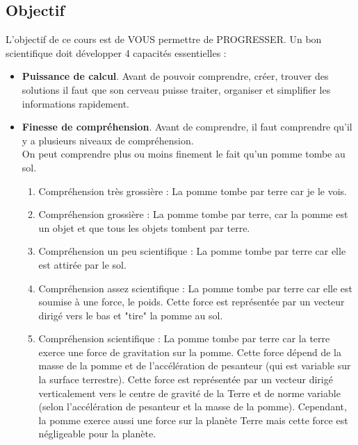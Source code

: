 \documentclass[12pt,fleqn]{report} %
\begin{document}
\subsection*{Objectif}
L'objectif de ce cours est de VOUS permettre de  PROGRESSER. Un bon scientifique doit développer 4 capacités essentielles : \begin{itemize}
	\item \textbf{Puissance de calcul}. Avant de pouvoir comprendre, créer, trouver des solutions il faut que son cerveau puisse traiter, organiser et simplifier les informations rapidement.
	\item \textbf{Finesse de compréhension}. Avant de comprendre, il faut comprendre qu'il y a plusieurs niveaux de compréhension. \\ On peut comprendre plus ou moins finement le fait qu'un pomme tombe au sol.\begin{enumerate}
		\item Compréhension très grossière : La pomme tombe par terre car je le vois.
		\item Compréhension grossière : La pomme tombe par terre, car la pomme est un objet et que tous les objets tombent par terre.
		\item Compréhension un peu scientifique : La pomme tombe par terre car elle est attirée par le sol.
		\item Compréhension assez scientifique : La pomme tombe par terre car elle est soumise à une force, le poids. Cette force est représentée par un vecteur dirigé vers le bas et "tire" la pomme au sol.
		\item Compréhension scientifique : La pomme tombe par terre car la terre exerce une force de gravitation sur la pomme. Cette force dépend de la masse de la pomme et de l'accélération de pesanteur (qui est variable sur la surface terrestre). Cette force est représentée par un vecteur dirigé verticalement vers le centre de gravité de la Terre et de norme variable (selon l'accélération de pesanteur et la masse de la pomme). Cependant, la pomme exerce aussi une force sur la planète Terre mais cette force est négligeable pour la planète.
	\end{enumerate}
	

\end{itemize}
\end{document}
